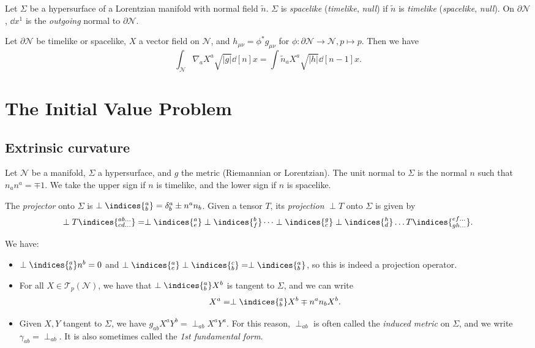 \documentclass{jknotes}
\begin{document}
\begin{defn}
    Let \(\Sigma\) be a hypersurface of a Lorentzian manifold with normal field \(\tilde{n}\). \(\Sigma\) is \emph{spacelike} (\emph{timelike}, \emph{null}) if \(\tilde{n}\) is \emph{timelike} (\emph{spacelike}, \emph{null}). On \(\partial\mathcal{N}\), \(\dd{x^1}\) is the \emph{outgoing} normal to \(\partial\mathcal{N}\).
\end{defn}

\begin{theorem}
    Let \(\partial\mathcal{N}\) be timelike or spacelike, \(X\) a vector field on \(\mathcal{N}\), and \(h_{\mu\nu} = \phi^*g_{\mu\nu}\) for \(\phi:\partial\mathcal{N}\to\mathcal{N},p\mapsto p\). Then we have
    \begin{equation}
        \int_{\mathcal{N}} \nabla_a X^a\sqrt{|g|} \dd[n]{x} = \int \tilde{n}_a X^a \sqrt{|h|} \dd[n-1]{x}.
    \end{equation}
\end{theorem}

\section{The Initial Value Problem}
\subsection{Extrinsic curvature}
Let \(\mathcal{N}\) be a manifold, \(\Sigma\) a hypersurface, and \(g\) the metric (Riemannian or Lorentzian). The unit normal to \(\Sigma\) is the normal \(n\) such that \(n_an^a = \mp1\). We take the upper sign if \(n\) is timelike, and the lower sign if \(n\) is spacelike.

\begin{defn}
    The \emph{projector} onto \(\Sigma\) is \(\perp\indices{^a_b}=\delta^a_b \pm n^an_b\). Given a tensor \(T\), its \emph{projection} \(\perp T\) onto \(\Sigma\) is given by
    \begin{equation}
        \perp T\indices{^{ab\dots}_{cd\dots}} = \perp\indices{^a_e}\perp\indices{^b_f}\dots\perp\indices{^g_c}\perp\indices{^h_d}\dots T\indices{^{ef\dots}_{gh\dots}}.
    \end{equation}
\end{defn}
We have:
\begin{itemize}
    \item \(\perp\indices{^a_b}n^b=0\) and \(\perp\indices{^a_c}\perp\indices{^c_b} = \perp\indices{^a_b}\), so this is indeed a projection operator.
    \item For all \(X\in\mathcal{T}_p(\mathcal{N})\), we have that \(\perp\indices{^a_b}X^b\) is tangent to \(\Sigma\), and we can write
        \begin{equation}
            X^a = \perp\indices{^a_b}X^b \mp n^an_bX^b.
        \end{equation}
    \item Given \(X,Y\) tangent to \(\Sigma\), we have \(g_{ab} X^aY^b=\perp_{ab}X^aY^a\). For this reason, \(\perp_{ab}\) is often called the \emph{induced metric} on \(\Sigma\), and we write \(\gamma_{ab} = \perp_{ab}\). It is also sometimes called the \emph{1st fundamental form}.
\end{itemize}
\end{document}

